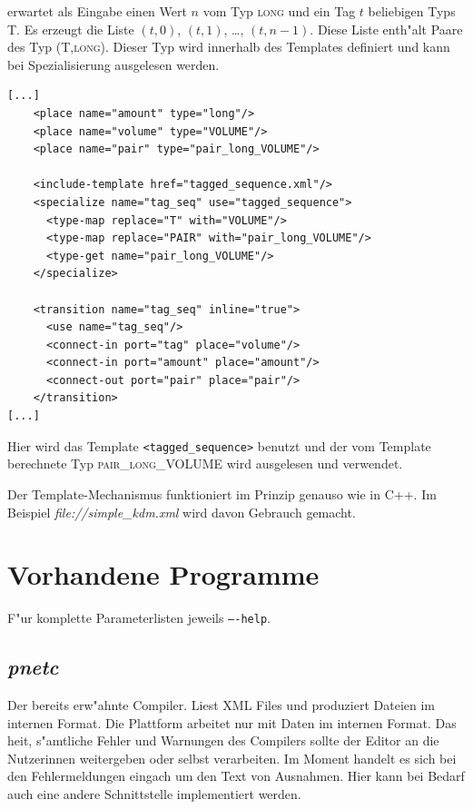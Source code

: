 \documentclass[a4paper,12pt]{article}
\newlength{\st}\setlength{\st}{0pt}
\newcommand{\type}[1]{\textsc{#1}}
\newcommand{\program}[1]{\textit{#1}}
\newcommand{\file}[1]{\textsl{file://#1}}
\newcommand{\function}[1]{\texttt{<#1>}}
\begin{document}
erwartet als Eingabe einen Wert $n$ vom Typ \type{long} und ein Tag
$t$ beliebigen Typs \type{T}. Es erzeugt die Liste $(t,0)$, $(t,1)$,
\ldots, $(t,n-1)$. Diese Liste enth"alt Paare des Typ
\type{(T,long)}. Dieser Typ wird innerhalb des Templates definiert und
kann bei Spezialisierung ausgelesen werden.
\begin{verbatim}
[...]
    <place name="amount" type="long"/>
    <place name="volume" type="VOLUME"/>
    <place name="pair" type="pair_long_VOLUME"/>

    <include-template href="tagged_sequence.xml"/>
    <specialize name="tag_seq" use="tagged_sequence">
      <type-map replace="T" with="VOLUME"/>
      <type-map replace="PAIR" with="pair_long_VOLUME"/>
      <type-get name="pair_long_VOLUME"/>
    </specialize>

    <transition name="tag_seq" inline="true">
      <use name="tag_seq"/>
      <connect-in port="tag" place="volume"/>
      <connect-in port="amount" place="amount"/>
      <connect-out port="pair" place="pair"/>
    </transition>
[...]
\end{verbatim}

Hier wird das Template \function{tagged\_sequence} benutzt und der vom
Template berechnete Typ \type{pair\_long\_VOLUME} wird ausgelesen und
verwendet.

Der Template-Mechanismus funktioniert im Prinzip genauso wie in
C++. Im Beispiel \file{simple\_kdm.xml} wird davon Gebrauch gemacht.

\section{Vorhandene Programme}

F"ur komplette Parameterlisten jeweils \texttt{----help}.

\subsection{\program{pnetc}}\label{sec:pnetc}

Der bereits erw"ahnte Compiler. Liest XML Files und produziert Dateien
im internen Format. Die Plattform arbeitet nur mit Daten im internen
Format. Das hei\3t, s"amtliche Fehler und Warnungen des Compilers
sollte der Editor an die Nutzerinnen weitergeben oder selbst
verarbeiten. Im Moment handelt es sich bei den Fehlermeldungen eingach
um den Text von Ausnahmen. Hier kann bei Bedarf auch eine andere
Schnittstelle implementiert werden.
\end{document}
